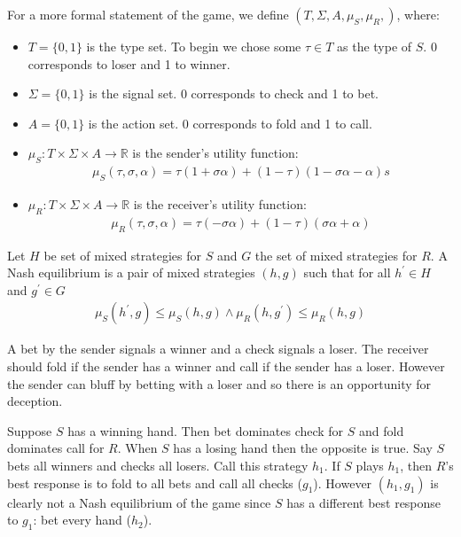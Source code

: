 \documentclass{article}
\begin{document}
For a more formal statement of the game, we define $\left(T, \Sigma, A, \mu_S, \mu_R, \right)$, where:
\begin{itemize}
    \item $T = \lbrace 0, 1 \rbrace$ is the type set. To begin we chose some $\tau \in T$ as the type of $S$. 0 corresponds to loser and 1 to winner.
    \item $\Sigma = \lbrace 0, 1 \rbrace$ is the signal set. 0 corresponds to check and 1 to bet.
        \item $A = \lbrace 0, 1 \rbrace$ is the action set. 0 corresponds to fold and 1 to call.
    \item $\mu_S: T \times \Sigma \times A \longrightarrow \mathbb{R}$ is the sender's utility function:
        \begin{align*}
\mu_S(\tau, \sigma, \alpha) = \tau(1+\sigma\alpha) + (1-\tau)(1-\sigma\alpha-\alpha)s
        \end{align*}
    \item $\mu_R: T \times \Sigma \times A \longrightarrow \mathbb{R}$ is the receiver's utility function:
        \begin{align*}
\mu_R(\tau, \sigma, \alpha) = \tau(-\sigma\alpha) + (1-\tau)(\sigma\alpha+\alpha)
        \end{align*}
\end{itemize}

Let $H$ be set of mixed strategies for $S$ and $G$ the set of mixed strategies for $R$. A Nash equilibrium is a pair of mixed strategies $(h,g)$ such that for all $h^\prime \in H$ and $g^\prime \in G$
\begin{align*}
    \mu_S(h^\prime,g) \le \mu_S(h,g) \land
    \mu_R(h,g^\prime) \le \mu_R(h,g)
\end{align*}

A bet by the sender signals a winner and a check signals a loser. The receiver should fold if the sender has a winner and call if the sender has a loser. However the sender can bluff by betting with a loser and so there is an opportunity for deception.

Suppose $S$ has a winning hand. Then bet dominates check for $S$ and fold dominates call for $R$. When $S$ has a losing hand then the opposite is true. Say $S$ bets all winners and checks all losers. Call this strategy $h_1$. If $S$ plays $h_1$, then $R$'s best response is to fold to all bets and call all checks ($g_1$). However $(h_1, g_1)$ is clearly not a Nash equilibrium of the game since $S$ has a different best response to $g_1$: bet every hand ($h_2$).
\end{document}
